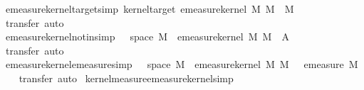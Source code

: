 \begin{isabellebody}
\ emeasure{\isacharunderscore}{\kern0pt}kernel{\isacharunderscore}{\kern0pt}target{\isacharbrackleft}{\kern0pt}simp{\isacharbrackright}{\kern0pt}{\isacharcolon}{\kern0pt}\ {\isachardoublequoteopen}kernel{\isacharunderscore}{\kern0pt}target\ {\isacharparenleft}{\kern0pt}emeasure{\isacharunderscore}{\kern0pt}kernel\ M\ M{\isacharprime}{\kern0pt}{\isacharparenright}{\kern0pt}\ {\isacharequal}{\kern0pt}\ M{\isacharprime}{\kern0pt}{\isachardoublequoteclose}\isanewline
%
\isadelimproof
\ \ %
\endisadelimproof
%
\isatagproof
{}\isamarkupfalse%
\ {\isacharparenleft}{\kern0pt}transfer{\isacharcomma}{\kern0pt}\ auto{\isacharparenright}{\kern0pt}%
\endisatagproof
{\isafoldproof}%
%
\isadelimproof
\isanewline
%
\endisadelimproof
\isanewline
{}\isamarkupfalse%
\ emeasure{\isacharunderscore}{\kern0pt}kernel{\isacharunderscore}{\kern0pt}notin{\isacharbrackleft}{\kern0pt}simp{\isacharbrackright}{\kern0pt}{\isacharcolon}{\kern0pt}\ {\isachardoublequoteopen}{\isasymomega}\ {\isasymnotin}\ space\ M\ {\isasymLongrightarrow}\ {\isacharparenleft}{\kern0pt}emeasure{\isacharunderscore}{\kern0pt}kernel\ M\ M{\isacharprime}{\kern0pt}{\isacharparenright}{\kern0pt}\ {\isasymomega}\ A{\isacharprime}{\kern0pt}\ {\isacharequal}{\kern0pt}\ {}{\isachardoublequoteclose}\isanewline
%
\isadelimproof
\ \ %
\endisadelimproof
%
\isatagproof
{}\isamarkupfalse%
\ {\isacharparenleft}{\kern0pt}transfer{\isacharcomma}{\kern0pt}\ auto{\isacharparenright}{\kern0pt}%
\endisatagproof
{\isafoldproof}%
%
\isadelimproof
\isanewline
%
\endisadelimproof
\isanewline
{}\isamarkupfalse%
\ emeasure{\isacharunderscore}{\kern0pt}kernel{\isacharunderscore}{\kern0pt}emeasure{\isacharbrackleft}{\kern0pt}simp{\isacharbrackright}{\kern0pt}{\isacharcolon}{\kern0pt}\ {\isachardoublequoteopen}{\isasymomega}\ {\isasymin}\ space\ M\ {\isasymLongrightarrow}\ {\isacharparenleft}{\kern0pt}emeasure{\isacharunderscore}{\kern0pt}kernel\ M\ M{\isacharprime}{\kern0pt}{\isacharparenright}{\kern0pt}\ {\isasymomega}\ {\isacharequal}{\kern0pt}\ emeasure\ M{\isacharprime}{\kern0pt}{\isachardoublequoteclose}\isanewline
%
\isadelimproof
\ \ %
\endisadelimproof
%
\isatagproof
{}\isamarkupfalse%
\ {\isacharparenleft}{\kern0pt}transfer{\isacharcomma}{\kern0pt}\ auto{\isacharparenright}{\kern0pt}%
\endisatagproof
{\isafoldproof}%
%
\isadelimproof
\isanewline
%
\endisadelimproof
\isanewline
{}\isamarkupfalse%
\ kernel{\isacharunderscore}{\kern0pt}measure{\isacharunderscore}{\kern0pt}emeasure{\isacharunderscore}{\kern0pt}kernel{\isacharbrackleft}{\kern0pt}simp{\isacharbrackright}{\kern0pt}{\isacharcolon}{\kern0pt}\isanewline

\end{isabellebody}
